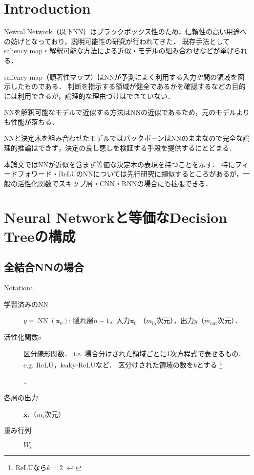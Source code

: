 \documentclass[dvipdfmx,autodetect-engine,12pt,fleqn]{jsarticle}
\DeclareMathOperator{\NN}{NN}
\newcounter{footnote-anchor}
\newcommand{\footnoteanchor}[1]{
    \hypertarget{footnote-anchor\arabic{footnote-anchor}}{}%
    \footnote{#1 \hyperlink{footnote-anchor\arabic{footnote-anchor}}{$\hookleftarrow$}}%
    \addtocounter{footnote-anchor}{1}
}
\begin{document}
\section{Introduction}

Newral Network（以下NN）はブラックボックス性のため，信頼性の高い用途への妨げとなっており，説明可能性の研究が行われてきた．
既存手法としてsaliency map・解釈可能な方法による近似・モデルの組み合わせなどが挙げられる．

saliency map（顕著性マップ）はNNが予測によく利用する入力空間の領域を図示したものである．%
判断を指示する領域が健全であるかを確認するなどの目的には利用できるが，論理的な理由づけはできていない．


NNを解釈可能なモデルで近似する方法はNNの近似であるため，元のモデルよりも性能が落ちる．

NNと決定木を組み合わせたモデルではバックボーンはNNのままなので完全な論理的推論はできず，決定の良し悪しを検証する手段を提供するにとどまる．

本論文ではNNが近似を含まず等価な決定木の表現を持つことを示す．
特にフィードフォワード・ReLUのNNについては先行研究に類似するところがあるが，一般の活性化関数でスキップ層・CNN・RNNの場合にも拡張できる．

\section{Neural Networkと等価なDecision Treeの構成}

\subsection{全結合NNの場合}

\noindent Notation:
\newcommand{\layervector}[1]{\bm{x}_{#1}}
\newcommand{\activation}[1]{\sigma\rbra{#1}}
\newcommand{\weightmatrix}[1]{W_{#1}}
\newcommand{\transpose}{\mathsf{T}}
\newcommand{\weightmatrixT}[1]{W_{#1}^\transpose}
\begin{description}
\item[学習済みのNN] $y=\NN(\layervector{0})$: 隠れ層$n-1$，入力$\layervector{0}$ （${m_{\text{in}}}$次元），出力$y$（$m_{\text{out}}$次元）．
\item[活性化関数$\sigma$] 区分線形関数．
i.e. 場合分けされた領域ごとに1次方程式で表せるもの．
e.g. ReLU，leaky-ReLUなど．
区分けされた領域の数を$k$とする\footnoteanchor{ReLUなら$k=2$}．
\item[各層の出力] $\layervector{i}$（$m_i$次元）
\item[重み行列] $W_i$
\end{description}
\end{document}
